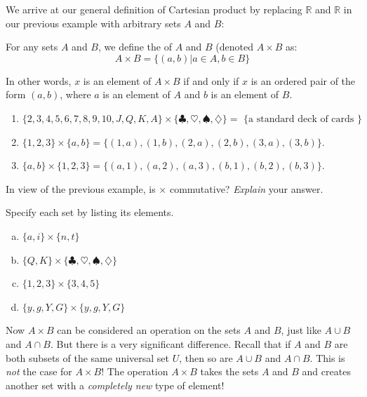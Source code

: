 We arrive at our general definition of Cartesian product by replacing ${\mathbb R}$ and ${\mathbb R}$ in our previous example with arbitrary sets $A$ and $B$:

\begin{defn}  \label{cartesianprod}
For any sets $A$ and $B$, we define the  of $A$ and $B$ (denoted $A \times B$ as:
\[
A \times B = \{ (a, b) | a \in A, b \in B \}\]

\noindent
In other words, $x$ is an element of $A \times B$ if and only if $x$ is an ordered pair of the form $(a,b)$, where $a$ is an element of $A$ and $b$ is an element of $B$.

\end{defn} 

\begin{example}{4}
\begin{enumerate} 
\item
$\{2, 3, 4, 5, 6, 7, 8, 9, 10, J, Q, K, A \} \times \{ \clubsuit, \heartsuit, \spadesuit, \diamondsuit \} =  \mbox{ \{a standard deck of cards \}}$
\item 
$\{1, 2, 3\} \times \{a, b\} = \{ (1, a), (1, b), (2, a), (2, b), (3, a), (3, b) \}$.
\item
$\{a, b\} \times \{1, 2, 3\} = \{ (a, 1), (a, 2), (a, 3), (b, 1), (b, 2), (b, 3) \}$. 
\end{enumerate}
\end{example}

\begin{exercise}{}
In view of the previous example, is $\times$ commutative?  \emph{Explain} your answer.
\end{exercise}
 
\begin{exercise}{6}
Specify each set by listing its elements. 
\begin{multicols}{2}
\begin{enumerate}[(a)]
\item
$\{a, i\} \times \{n, t\}$
\item
$\{Q, K\} \times \{ \clubsuit, \heartsuit, \spadesuit, \diamondsuit \}$
\item
$\{1, 2, 3\} \times \{3, 4, 5\}$
\item
$\{y,g,Y,G\} \times \{y,g,Y,G\}$
\end{enumerate}
\end{multicols}
\end{exercise}

Now $A \times B$ can be considered an operation on the sets $A$ and $B$, just like $A \cup B$ and $A \cap B$. But there is a very significant difference. Recall that if $A$ and $B$ are both subsets of the same universal set $U$, then so are $A \cup B$ and $A \cap B$. This is \emph{not} the case for $A \times B$! The operation $A \times B$ takes the sets $A$ and $B$ and creates another set with a \emph{completely new} type of element!

